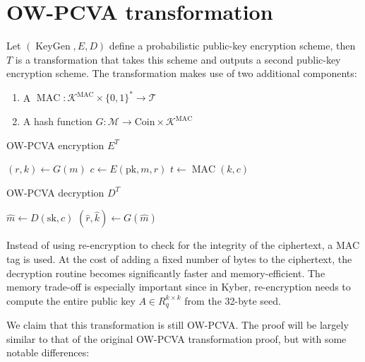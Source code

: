 \documentclass{article}
\newcommand{\keygen}{\operatorname{KeyGen}}
\begin{document}
\section{OW-PCVA transformation}
Let $(\keygen, E, D)$ define a probabilistic public-key encryption scheme, then $T$ is a transformation that takes this scheme and outputs a second public-key encryption scheme. The transformation makes use of two additional components:

\begin{enumerate}
    \item A $\operatorname{MAC}: \mathcal{K}^\text{MAC} \times \{0,1\}^\ast \rightarrow \mathcal{T}$
    \item A hash function $G: \mathcal{M} \rightarrow \text{Coin} \times \mathcal{K}^\text{MAC}$
\end{enumerate}

\begin{multicols}{2}
    \begin{algorithm}[H]
        \SetAlgoLined
        \caption{OW-PCVA encryption $E^T$}
        $(r, k) \leftarrow G(m)$\;
        $c \leftarrow E(\text{pk}, m, r)$\;
        $t \leftarrow \operatorname{MAC}(k, c)$
        \;
        \;
    \end{algorithm}

    \columnbreak

    \begin{algorithm}[H]
        \SetAlgoLined
        \caption{OW-PCVA decryption $D^T$}
        $\hat{m} \leftarrow D(\text{sk}, c)$\;
        $(\hat{r}, \hat{k}) \leftarrow G(\hat{m})$\;
        \;
    \end{algorithm}
\end{multicols}

Instead of using re-encryption to check for the integrity of the ciphertext, a MAC tag is used. At the cost of adding a fixed number of bytes to the ciphertext, the decryption routine becomes significantly faster and memory-efficient. The memory trade-off is especially important since in Kyber, re-encryption needs to compute the entire public key $A \in R_q^{k \times k}$ from the 32-byte seed.

We claim that this transformation is still OW-PCVA. The proof will be largely similar to that of the original OW-PCVA transformation proof, but with some notable differences:
\end{document}
